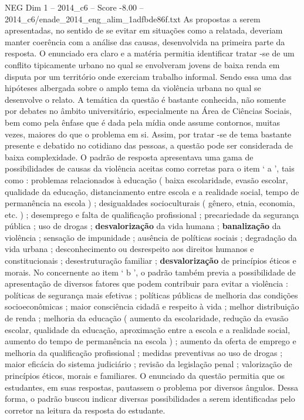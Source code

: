 \begin{textsample}{NEG Dim 1 – 2014\_c6 – Score -8.00 – 2014\_c6/enade\_2014\_eng\_alim\_1adfbde86f.txt}
As propostas a serem apresentadas, no sentido de se evitar em situações como a relatada, deveriam manter coerência com a análise das causas, desenvolvida na primeira parte da resposta.
O enunciado era claro e a matéria permitia identificar tratar -se de um conflito tipicamente urbano no qual se envolveram jovens de baixa renda em disputa por um território onde exerciam trabalho informal.
Sendo essa uma das hipóteses albergada sobre o amplo tema da violência urbana no qual se desenvolve o relato.
A temática da questão é bastante conhecida, não somente por debates no âmbito universitário, especialmente na Área de Ciências Sociais, bem como pela ênfase que é dada pela mídia onde assume contornos, muitas vezes, maiores do que o problema em si.
Assim, por tratar -se de tema bastante presente e debatido no cotidiano das pessoas, a questão pode ser considerada de baixa complexidade.
O padrão de resposta apresentava uma gama de possibilidades de causas da violência aceitas como corretas para o item ‘ a ’, tais como : problemas relacionados à educação ( baixa escolaridade, evasão escolar, qualidade da educação, distanciamento entre escola e a realidade social, tempo de permanência na escola ) ; desigualdades socioculturais ( gênero, etnia, economia, etc. ) ; desemprego e falta de qualificação profissional ; precariedade da segurança pública ; uso de drogas ; \textbf{desvalorização} da vida humana ; \textbf{banalização} da violência ; sensação de impunidade ; ausência de políticas sociais ; degradação da vida urbana ; desconhecimento ou desrespeito aos direitos humanos e constitucionais ; desestruturação familiar ; \textbf{desvalorização} de princípios éticos e morais.
No concernente ao item ‘ b ’, o padrão também previa a possibilidade de apresentação de diversos fatores que podem contribuir para evitar a violência : políticas de segurança mais efetivas ; políticas públicas de melhoria das condições socioeconômicas ; maior consciência cidadã e respeito à vida ; melhor distribuição de renda ; melhoria da educação ( aumento da escolaridade, redução da evasão escolar, qualidade da educação, aproximação entre a escola e a realidade social, aumento do tempo de permanência na escola ) ; aumento da oferta de emprego e melhoria da qualificação profissional ; medidas preventivas ao uso de drogas ; maior eficácia do sistema judiciário ; revisão da legislação penal ; valorização de princípios éticos, morais e familiares.
O enunciado da questão permitia que os estudantes, em suas respostas, pautassem o problema por diversos ângulos.
Dessa forma, o padrão buscou indicar diversas possibilidades a serem identificadas pelo corretor na leitura da resposta do estudante.

\end{textsample}
